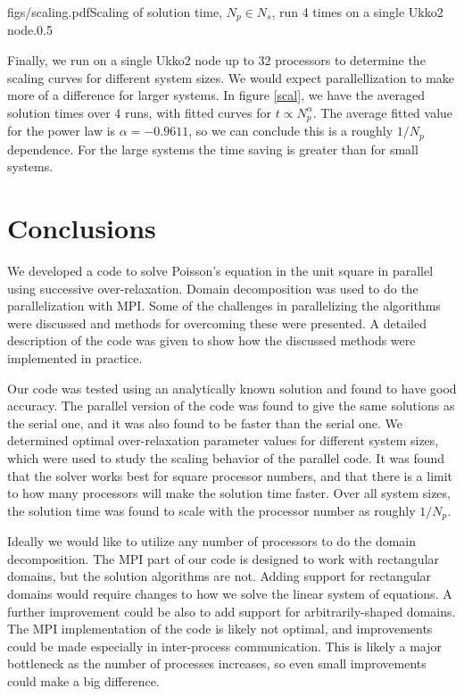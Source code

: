 \documentclass[10pt]{article}
\begin{document}
\fig
{figs/scaling.pdf}{Scaling of solution time, $N_p \in N_s$, run 4 times on a single Ukko2 node.\label{scal}}{0.5}

Finally, we run on a single Ukko2 node up to 32 processors to determine the scaling curves for different system sizes. We would expect parallellization to make more of a difference for larger systems. In figure \ref{scal}, we have the averaged solution times over 4 runs, with fitted curves for $t \propto N_p^\alpha$. The average fitted value for the power law is $\alpha = -0.9611$, so we can conclude this is a roughly $1/N_p$ dependence. For the large systems the time saving is greater than for small systems.

\section{Conclusions}

We developed a code to solve Poisson's equation in the unit square in parallel using successive over-relaxation. Domain decomposition was used to do the parallelization with MPI. Some of the challenges in parallelizing the algorithms were discussed and methods for overcoming these were presented. A detailed description of the code was given to show how the discussed methods were implemented in practice.

Our code was tested using an analytically known solution and found to have good accuracy. The parallel version of the code was found to give the same solutions as the serial one, and it was also found to be faster than the serial one. We determined optimal over-relaxation parameter values for different system sizes, which were used to study the scaling behavior of the parallel code. It was found that the solver works best for square processor numbers, and that there is a limit to how many processors will make the solution time faster. Over all system sizes, the solution time was found to scale with the processor number as roughly $1/N_p$.

Ideally we would like to utilize any number of processors to do the domain decomposition. The MPI part of our code is designed to work with rectangular domains, but the solution algorithms are not. Adding support for rectangular domains would require changes to how we solve the linear system of equations. A further improvement could be also to add support for arbitrarily-shaped domains. The MPI implementation of the code is likely not optimal, and improvements could be made especially in inter-process communication. This is likely a major bottleneck as the number of processes increases, so even small improvements could make a big difference.
\end{document}
